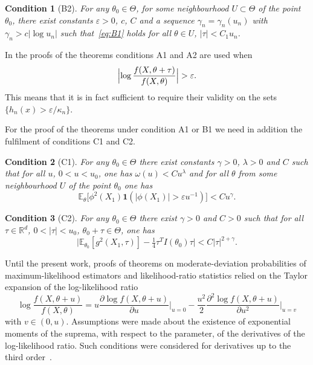 \documentclass[11pt,a4paper]{article}
\newtheorem{condition}{Condition}
\begin{document}
\begin{condition}[B2]
For any $\theta_0\in\Theta$, for some neighbourhood $U\subset\Theta$ of the point $\theta_0$, there exist constants $\varepsilon>0$, $c$, $C$ and a sequence $\gamma_n=\gamma_n(u_n)$ with $\gamma_n>c|\log u_n|$ such that~\eqref{eq:B1} holds for all $\theta\in U$, $|\tau|<C_1u_n$.
\end{condition}

In the proofs of the theorems conditions A1 and A2 are used when
\[
\Bigl|\log\frac{f(X,\theta+\tau)}{f(X,\theta)}\Bigr|>\varepsilon.
\]
This means that it is in fact sufficient to require their validity on the sets $\{h_n(x)>\varepsilon/\kappa_n\}$.

For the proof of the theorems under condition A1 or B1 we need in addition the fulfilment of conditions C1 and C2.

\begin{condition}[C1]
For any $\theta_0\in\Theta$ there exist constants $\gamma>0$, $\lambda>0$ and $C$ such that for all $u$, $0<u<u_0$, one has $\omega(u)<Cu^\lambda$ and for all $\theta$ from some neighbourhood $U$ of the point $\theta_0$ one has
\begin{equation}
\mathbb{E}_\theta\bigl[\phi^2(X_1)\mathbf{1}(|\phi(X_1)|>\varepsilon u^{-1})\bigr]<Cu^\gamma.
\label{eq:C1}
\end{equation}
\end{condition}

\begin{condition}[C2]
For any $\theta_0\in\Theta$ there exist $\gamma>0$ and $C>0$ such that for all $\tau\in\mathbb{R}^d$, $0<|\tau|<u_0$, $\theta_0+\tau\in\Theta$, one has
\begin{equation}
\bigl|\mathbb{E}_{\theta_0}[g^2(X_1,\tau)]-\tfrac14\tau^T I(\theta_0)\tau\bigr|<C|\tau|^{2+\gamma}.
\label{eq:C2}
\end{equation}
\end{condition}

Until the present work, proofs of theorems on moderate-deviation probabilities of maximum-likelihood estimators and likelihood-ratio statistics relied on the Taylor expansion of the log-likelihood ratio
\begin{equation}
\log\frac{f(X,\theta+u)}{f(X,\theta)}=u\frac{\partial\log f(X,\theta+u)}{\partial u}\Big|_{u=0}-\frac{u^2}{2}\frac{\partial^2\log f(X,\theta+u)}{\partial u^2}\Big|_{u=v}
\label{eq:Taylor}
\end{equation}
with $v\in(0,u)$. Assumptions were made about the existence of exponential moments of the suprema, with respect to the parameter, of the derivatives of the log-likelihood ratio. Such conditions were considered for derivatives up to the third order~\cite{1,2,8,11,14,17}.
\end{document}
